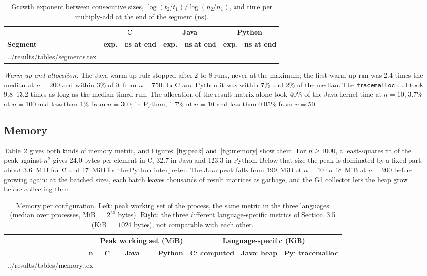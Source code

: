 \documentclass[12pt,a4paper]{article}
\makeatletter
\newcommand{\tableinput}[1]{\@@input #1 }
\makeatother
\begin{document}
\begin{table}[htbp]
\centering
\small
\begin{tabular}{lrrrrrr}
\toprule
& \multicolumn{2}{c}{\textbf{C}} & \multicolumn{2}{c}{\textbf{Java}}
& \multicolumn{2}{c}{\textbf{Python}} \\
\textbf{Segment} & \textbf{exp.} & \textbf{ns at end} & \textbf{exp.} & \textbf{ns at end}
& \textbf{exp.} & \textbf{ns at end} \\
\midrule
\tableinput{../results/tables/segments.tex}
\bottomrule
\end{tabular}
\caption{Growth exponent between consecutive sizes, $\log(t_2/t_1)/\log(n_2/n_1)$, and
time per multiply-add at the end of the segment (ns).}
\label{tab:segments}
\end{table}

\textit{Warm-up and allocation.} The Java warm-up rule stopped after 2 to 8 runs, never at
the maximum; the first warm-up run was 2.4 times the median at $n = 200$ and within 3\% of
it from $n = 750$. In C and Python it was within 7\% and 2\% of the median. The
\texttt{tracemalloc} call took 9.8--13.2 times as long as the median timed run. The
allocation of the result matrix alone took 40\% of the Java kernel time at $n = 10$,
3.7\% at $n = 100$ and less than 1\% from $n = 300$; in Python, 1.7\% at $n = 10$ and
less than 0.05\% from $n = 50$.

\subsection{Memory}

Table~\ref{tab:memory} gives both kinds of memory metric, and Figures~\ref{fig:peak}
and~\ref{fig:memory} show them. For $n \ge 1000$, a least-squares fit of the peak
against $n^2$ gives 24.0 bytes per element in C, 32.7 in Java and 123.3 in Python. Below
that size the peak is dominated by a fixed part: about 3.6~MiB for C and 17~MiB for the
Python interpreter. The Java peak falls from 199~MiB at $n = 10$ to 48~MiB at $n = 200$
before growing again: at the batched sizes, each batch leaves thousands of result
matrices as garbage, and the G1 collector lets the heap grow before collecting them.

\begin{table}[htbp]
\centering
\small
\begin{tabular}{rrrrrrr}
\toprule
& \multicolumn{3}{c}{\textbf{Peak working set (MiB)}}
& \multicolumn{3}{c}{\textbf{Language-specific (KiB)}} \\
\textbf{n} & \textbf{C} & \textbf{Java} & \textbf{Python} & \textbf{C: computed}
& \textbf{Java: heap} & \textbf{Py: tracemalloc} \\
\midrule
\tableinput{../results/tables/memory.tex}
\bottomrule
\end{tabular}
\caption{Memory per configuration. Left: peak working set of the process, the same
metric in the three languages (median over processes, MiB $= 2^{20}$ bytes). Right: the
three different language-specific metrics of Section~3.5 (KiB $= 1024$ bytes), not
comparable with each other.}
\label{tab:memory}
\end{table}
\end{document}
